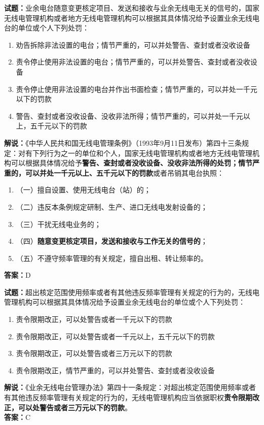 \documentclass{ctexbook}
\begin{document}
\noindent\textbf{试题：}业余电台随意变更核定项目、发送和接收与业余无线电无关的信号的，国家无线电管理机构或者地方无线电管理机构可以根据其具体情况给予设置业余无线电台的单位或个人下列处罚：
\begin{enumerate}[leftmargin=3em]
\item 劝告拆除非法设置的电台；情节严重的，可以并处警告、查封或者没收设备
\item 责令停止使用非法设置的电台；情节严重的，可以并处警告、查封或者没收设备
\item 责令停止使用非法设置的电台并作出书面检查；情节严重的，可以并处一千元以下的罚款
\item 警告、查封或者没收设备、没收非法所得；情节严重的，可以并处一千元以上，五千元以下的罚款
\end{enumerate}
\noindent\textbf{解说：}《中华人民共和国无线电管理条例》（1993年9月11日发布）第四十三条规定：对有下列行为之一的单位和个人，国家无线电管理机构或者地方无线电管理机构可以根据具体情况给予\textbf{警告、查封或者没收设备、没收非法所得的处罚；情节严重的，可以并处一千元以上、五千元以下的罚款}或者吊销其电台执照：
\begin{enumerate}[leftmargin=3em, label=]
	\item（一）擅自设置、使用无线电台（站）的；
	\item（二）违反本条例规定研制、生产、进口无线电发射设备的；
	\item（三）干扰无线电业务的；
	\item（四）\textbf{随意变更核定项目，发送和接收与工作无关的信号的}；
	\item（五）不遵守频率管理的有关规定，擅自出租、转让频率的。
\end{enumerate}
\textbf{答案：}D

\bigskip




\noindent\textbf{试题：}超出核定范围使用频率或者有其他违反频率管理有关规定的行为的，无线电管理机构可以根据其具体情况给予设置业余无线电台的单位或个人下列处罚：
\begin{enumerate}[leftmargin=3em]
\item 责令限期改正，可以处警告或者一千元以下的罚款
\item 责令限期改正，可以处警告或者一千元以上，五千元以下的罚款
\item 责令限期改正，可以处警告或者三万元以下的罚款
\item 责令限期改正，情节严重的，可以并处警告、查封或者没收设备
\end{enumerate}
\noindent\textbf{解说：}《业余无线电台管理办法》第四十一条规定：对超出核定范围使用频率或者有其他违反频率管理有关规定的行为的，无线电管理机构应当依据职权\textbf{责令限期改正，可以处警告或者三万元以下的罚款}。\\\textbf{答案：}C
\end{document}
